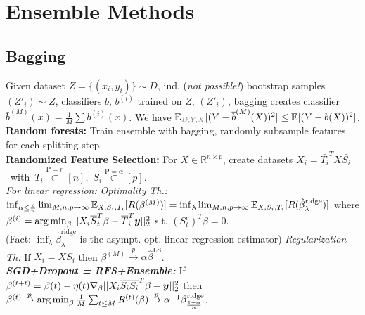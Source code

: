 \section*{Ensemble Methods}
\subsection*{Bagging}
Given dataset $Z =\{(x_i,y_i)\}\sim D$, ind. (\emph{not possible!}) bootstrap samples $(Z'_i) \sim Z$, classifiers $b$, $b^{(i)}$ trained on $Z$, $(Z'_i)$, bagging creates classifier $\bar{b}^{(M)}(x) = \frac{1}{M}\sum b^{(i)}(x)$. We have $\E_{\color{gray}D,Y,X}[(Y-\bar{b}^{(M)}(X))^2] \leq \E[(Y-b(X))^2]$.\\
\textbf{Random forests:} Train ensemble with bagging, randomly subsample features for each splitting step.\\
\textbf{Randomized Feature Selection:} For $X\in\mathbb{R}^{n\times p}$, create datasets \mbox{$X_i = \bar{T_i}^TX\bar{S_i}$ with $T_i \overset{\mathrm{P= \eta}}{\subset} [n]$, $S_i \overset{\mathrm{P=\alpha}}{\subset} [p]$.}\\
\emph{For linear regression:}
\emph{Optimality Th.:} $\inf_{\alpha\leq\frac{p}{n}}\lim_{M,n,p\to\infty}\mathbb{E}_{X,S_i,T_i}[R(\beta^{(M)})] = \inf_{\lambda}\lim_{M,n,p\to\infty}\mathbb{E}_{X,S_i,T_i}[R(\hat{\beta}_{\lambda}^{\mathrm{ridge}})]$  where $\beta^{(i)} = \operatorname*{arg\,min}_\beta ||X_i\overline{S}_t^T\beta - \overline{T}_i^T{\bm{y}}||^2_2$ s.t. $(S^c_t)^T\beta=0$.\\ (Fact: $\inf_{\lambda}\hat{\beta}_{\lambda}^{\mathrm{ridge}}$ is the asympt. opt. linear regression estimator)
\emph{Regularization Th:} If $X_i = X\bar{S_i}$ then $\beta^{(M)}\overset{p}{\to}\alpha\hat{\beta}^{\mathrm{LS}}$.\\
\emph{\textbf{SGD+Dropout = RFS+Ensemble:}} \mbox{If $\beta^{(t+t)} = \beta{(t)}-\eta(t)\nabla_\beta||X_i\overline{S_i}\overline{S_i}^T\beta - {\bm{y}}||^2_2$} then $\beta^{(t)} \overset{p}{\to}\operatorname*{arg\,min}_\beta \frac{1}{M}\sum_{t\leq M}R^{(t)}(\beta)\overset{p}{\to}\alpha^{-1}\beta^{\mathrm{ridge}}_{\frac{1-\alpha}{\alpha}}$.

